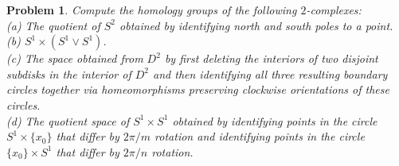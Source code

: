 \documentclass{article}
\newtheorem{problem}{Problem}
\begin{document}
\begin{problem}
Compute the homology groups of the following $2$-complexes:\\
(a) The quotient of $S^2$ obtained by identifying north and south poles to a point.\\
(b) $S^1 \times (S^1 \vee S^1)$.\\
(c) The space obtained from $D^2$ by first deleting the interiors of two disjoint subdisks in the interior of $D^2$ and then identifying all three resulting boundary circles together via homeomorphisms preserving clockwise orientations of these circles.\\
(d) The quotient space of $S^1 \times S^1$ obtained by identifying points in the circle $S^1 \times \{x_0\}$ that differ by $2 \pi / m$ rotation and identifying points in the circle $\{x_0\} \times S^1$ that differ by $2 \pi / n$ rotation.
\end{problem}
\end{document}
